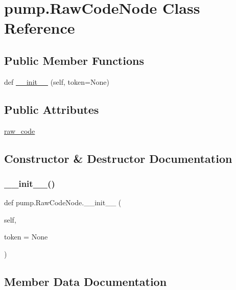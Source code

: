 \hypertarget{classpump_1_1_raw_code_node}{}\section{pump.\+Raw\+Code\+Node Class Reference}
\label{classpump_1_1_raw_code_node}
\subsection*{Public Member Functions}
\begin{DoxyCompactItemize}
\item 
def \mbox{\hyperlink{classpump_1_1_raw_code_node_a7ba81f4da42d4e96a89713032867f87f}{\+\_\+\+\_\+init\+\_\+\+\_\+}} (self, token=None)
\end{DoxyCompactItemize}
\subsection*{Public Attributes}
\begin{DoxyCompactItemize}
\item 
\mbox{\hyperlink{classpump_1_1_raw_code_node_ab36224d959e0d8f803e9fac8e6a0baab}{raw\+\_\+code}}
\end{DoxyCompactItemize}


\subsection{Constructor \& Destructor Documentation}
\mbox{\label{classpump_1_1_raw_code_node_a7ba81f4da42d4e96a89713032867f87f}} 
\subsubsection{\texorpdfstring{\_\_init\_\_()}{\_\_init\_\_()}}
{\footnotesize\ttfamily def pump.\+Raw\+Code\+Node.\+\_\+\+\_\+init\+\_\+\+\_\+ (\begin{DoxyParamCaption}\item[{}]{self,  }\item[{}]{token = {\ttfamily None} }\end{DoxyParamCaption})}



\subsection{Member Data Documentation}
\mbox{\label{classpump_1_1_raw_code_node_ab36224d959e0d8f803e9fac8e6a0baab}} 
